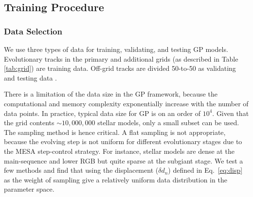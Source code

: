 \subsection{Training Procedure}\label{workflow}
  
\subsubsection{Data Selection}

We use three types of data for training, validating, and testing GP models. 
%
Evolutionary tracks in the primary and additional grids (as described in Table \ref{tab:grid}) are training data. Off-grid tracks are divided 50-to-50 as validating and testing data . 

There is a limitation of the data size in the GP framework, because the computational and memory complexity exponentially increase with the number of data points. In practice, typical data size for GP is on an order of $10^{4}$. Given that the grid contents $\sim 10,000,000$ stellar models, only a small subset can be used. The sampling method is hence critical.
%
 A flat sampling is not appropriate, because the evolving step is not uniform for different evolutionary stages due to the \textsc{MESA} step-control strategy. For instance, stellar models are dense at the main-sequence and lower RGB but quite sparse at the subgiant stage. We test a few methods and find that using the displacement ($\delta d_{n}$) defined in Eq.~\ref{eq:disp} as the weight of sampling give a relatively uniform data distribution in the parameter space. 

